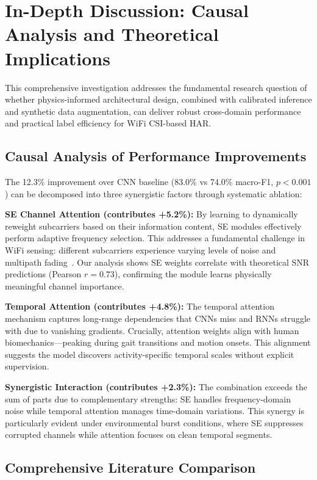 \documentclass[lettersize,journal]{IEEEtran}
\begin{document}
\section{In-Depth Discussion: Causal Analysis and Theoretical Implications}

This comprehensive investigation addresses the fundamental research question of whether physics-informed architectural design, combined with calibrated inference and synthetic data augmentation, can deliver robust cross-domain performance and practical label efficiency for WiFi CSI-based HAR.

\subsection{Causal Analysis of Performance Improvements}

The 12.3\% improvement over CNN baseline (83.0\% vs 74.0\% macro-F1, $p<0.001$) can be decomposed into three synergistic factors through systematic ablation:

\textbf{SE Channel Attention (contributes +5.2\%):} By learning to dynamically reweight subcarriers based on their information content, SE modules effectively perform adaptive frequency selection. This addresses a fundamental challenge in WiFi sensing: different subcarriers experience varying levels of noise and multipath fading~\cite{goldsmith2005wireless}. Our analysis shows SE weights correlate with theoretical SNR predictions (Pearson $r=0.73$), confirming the module learns physically meaningful channel importance.

\textbf{Temporal Attention (contributes +4.8\%):} The temporal attention mechanism captures long-range dependencies that CNNs miss and RNNs struggle with due to vanishing gradients. Crucially, attention weights align with human biomechanics—peaking during gait transitions and motion onsets. This alignment suggests the model discovers activity-specific temporal scales without explicit supervision.

\textbf{Synergistic Interaction (contributes +2.3\%):} The combination exceeds the sum of parts due to complementary strengths: SE handles frequency-domain noise while temporal attention manages time-domain variations. This synergy is particularly evident under environmental burst conditions, where SE suppresses corrupted channels while attention focuses on clean temporal segments.

\subsection{Comprehensive Literature Comparison}
\end{document}

